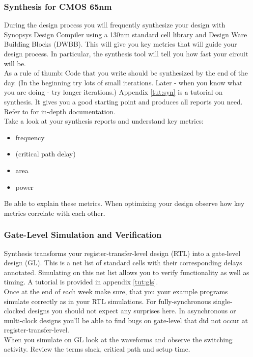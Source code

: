 \subsubsection{Synthesis for CMOS 65nm}
During the design process you will frequently synthesize your design with Synopsys Design Compiler using a 130nm standard cell library and Design Ware Building Blocks (DWBB). This will give you key metrics that will guide your design process. In particular, the synthesis tool will tell you how fast your circuit will be.\\
As a rule of thumb: Code that you write should be synthesized by the end of the day. (In the beginning try lots of small iterations. Later - when you know what you are doing - try longer iterations.) Appendix \ref{tut:syn} is a tutorial on synthesis. It gives you a good starting point and produces all reports you need. Refer to \cite{synopsys} for in-depth documentation.\\
Take a look at your synthesis reports and understand key metrics:
\begin{itemize}
\item frequency
\item (critical path delay)
\item area
\item power
\end{itemize} Be able to explain these metrics. When optimizing your design observe how key metrics correlate with each other.

\subsubsection{Gate-Level Simulation and Verification}
Synthesis transforms your register-transfer-level design (RTL) into a gate-level design (GL). This is a net list of standard cells with their corresponding delays annotated. Simulating on this net list allows you to verify functionality as well as timing. A tutorial is provided in appendix \ref{tut:gls}.\\
Once at the end of each week make sure, that you your example programs simulate correctly as in your RTL simulations. For fully-synchronous single-clocked designs you should not expect any surprises here. In asynchronous or multi-clock designs you'll be able to find bugs on gate-level that did not occur at register-transfer-level.\\
When you simulate on GL look at the waveforms and observe the switching activity. Review the terms slack, critical path and setup time.

